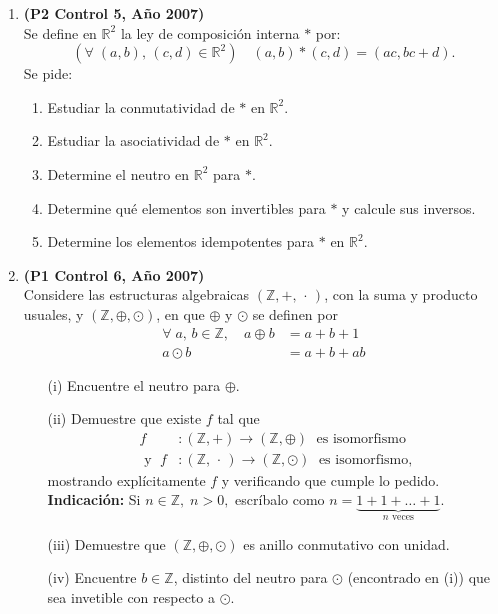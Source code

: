 \documentclass[11pt]{article}
\newcommand{\R}{\mathbb R}
\newcommand{\Z}{\mathbb Z}
\theoremstyle{plain}
\theoremstyle{definition}
\begin{document}
\begin{enumerate}
\item \textbf{(P2 Control 5, Año 2007)}\\
Se define en $\R^2$ la ley de composición interna $*$ por:
$$(\forall\;(a,b),\,(c,d)\in\R^2)\quad (a,b)*(c,d)=(ac,bc+d).$$
Se pide:
\begin{enumerate}
\item Estudiar la conmutatividad de $*$ en $\R^2$.
\item Estudiar la asociatividad de $*$ en $\R^2$.
\item Determine el neutro en $\R^2$ para $*$.
\item Determine qué elementos son invertibles para $*$ y calcule sus inversos.
\item Determine los elementos idempotentes para $*$ en $\R^2$.
\end{enumerate}

\item \textbf{(P1 Control 6, Año 2007)}\\
Considere las estructuras algebraicas $(\Z,+,\,\cdot\,)$, con la suma y producto usuales, y $(\Z,\oplus, \odot)$, en que $\oplus$ y $\odot$ se definen por
\begin{align*}
\forall\;a,\,b\in \Z,\quad a\oplus b&=a+b+1\\
a\odot b&=a+b+ab
\end{align*}
\begin{enumerate}
\item[(i)] Encuentre el neutro para $\oplus$.
\item[(ii)] Demuestre que existe $f$ tal que
\begin{align*}
f&: (\Z,+)\longrightarrow (\Z,\oplus) \; \mbox{ es isomorfismo}\\
\mbox{ y } \; f&: (\Z,\,\cdot\,) \longrightarrow (\Z,\odot)\; \mbox{ es isomorfismo,}
\end{align*}
mostrando explícitamente $f$ y verificando que cumple lo pedido.\\
\textbf{Indicación:} Si $n\in\Z,\; n>0,$ escríbalo como $n=\underbrace{1+1+\ldots+1}_{\mbox{$n$ veces}}$.

\item[(iii)] Demuestre que $(\Z,\oplus, \odot)$ es anillo conmutativo con unidad.
\item[(iv)] Encuentre $b\in\Z$, distinto del neutro para $\odot$ (encontrado en (i)) que sea invetible con respecto a $\odot$.


\end{enumerate}



\end{enumerate}
\end{document}

